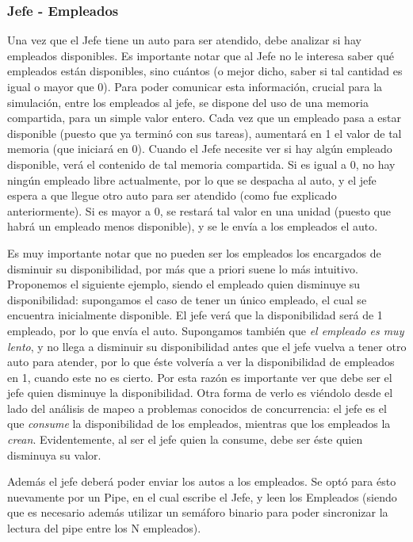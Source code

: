 \documentclass[a4paper,12pt]{article}
\begin{document}
\subsubsection{Jefe - Empleados}
Una vez que el Jefe tiene un auto para ser atendido, debe analizar si hay empleados disponibles. Es importante notar que al Jefe no le interesa saber qué empleados están disponibles, sino cuántos (o mejor dicho, saber si tal cantidad es igual o mayor que 0). Para poder comunicar esta información, crucial para la simulación, entre los empleados al jefe, se dispone del uso de una memoria compartida, para un simple valor entero. Cada vez que un empleado pasa a estar disponible (puesto que ya terminó con sus tareas), aumentará en 1 el valor de tal memoria (que iniciará en 0). Cuando el Jefe necesite ver si hay algún empleado disponible, verá el contenido de tal memoria compartida. Si es igual a 0, no hay ningún empleado libre actualmente, por lo que se despacha al auto, y el jefe espera a que llegue otro auto para ser atendido (como fue explicado anteriormente). Si es mayor a 0, se restará tal valor en una unidad (puesto que habrá un empleado menos disponible), y se le envía a los empleados el auto. 

Es muy importante notar que no pueden ser los empleados los encargados de disminuir su disponibilidad, por más que a priori suene lo más intuitivo. Proponemos el siguiente ejemplo, siendo el empleado quien disminuye su disponibilidad: supongamos el caso de tener un único empleado, el cual se encuentra inicialmente disponible. El jefe verá que la disponibilidad será de 1 empleado, por lo que envía el auto. Supongamos también que \textit{el empleado es muy lento}, y no llega a disminuir su disponibilidad antes que el jefe vuelva a tener otro auto para atender, por lo que éste volvería a ver la disponibilidad de empleados en 1, cuando este no es cierto. Por esta razón es importante ver que debe ser el jefe quien disminuye la disponibilidad. Otra forma de verlo es viéndolo desde el lado del análisis de mapeo a problemas conocidos de concurrencia: el jefe es el que \textit{consume} la disponibilidad de los empleados, mientras que los empleados la \textit{crean}. Evidentemente, al ser el jefe quien la consume, debe ser éste quien disminuya su valor.

Además el jefe deberá poder enviar los autos a los empleados. Se optó para ésto nuevamente por un Pipe, en el cual escribe el Jefe, y leen los Empleados (siendo que es necesario además utilizar un semáforo binario para poder sincronizar la lectura del pipe entre los N empleados).
\end{document}
